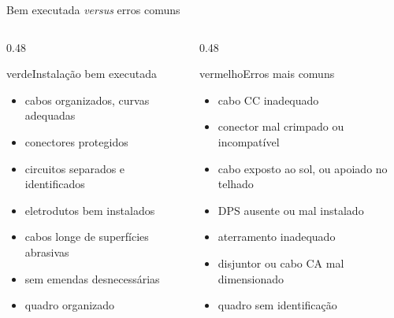 \documentclass[aspectratio=169,10pt,xcolor=table]{beamer}
\begin{document}
\begin{frame}{Bem executada \emph{versus} erros comuns}
  \begin{columns}[T]
    \begin{column}{0.48\textwidth}
      \begin{card}[equal height group=be]{verde}{\faCheckCircle\enspace Instalação bem executada}
        \begin{itemize}
          \item cabos organizados, curvas adequadas
          \item conectores protegidos
          \item circuitos separados e identificados
          \item eletrodutos bem instalados
          \item cabos longe de superfícies abrasivas
          \item sem emendas desnecessárias
          \item quadro organizado
        \end{itemize}
      \end{card}
    \end{column}
    \begin{column}{0.48\textwidth}
      \begin{card}[equal height group=be]{vermelho}{\faTimesCircle\enspace Erros mais comuns}
        \begin{itemize}
          \item cabo CC inadequado
          \item conector mal crimpado ou incompatível
          \item cabo exposto ao sol, ou apoiado no telhado
          \item DPS ausente ou mal instalado
          \item aterramento inadequado
          \item disjuntor ou cabo CA mal dimensionado
          \item quadro sem identificação
        \end{itemize}
      \end{card}
    \end{column}
  \end{columns}
\end{frame}
\end{document}
